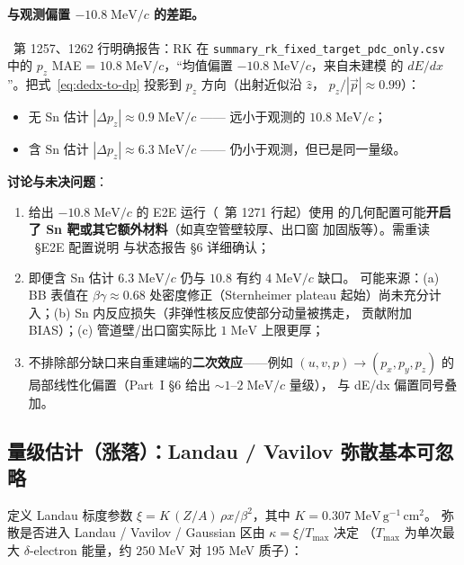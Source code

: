 \paragraph{与观测偏置 $-10.8\;\mathrm{MeV}/c$ 的差距。}
\StatusReport{}~第 1257、1262 行明确报告：RK 在 \texttt{summary\_rk\_fixed\_target\_pdc\_only.csv}
中的 $p_z$ MAE = $10.8\;\mathrm{MeV}/c$，``均值偏置 $-10.8\;\mathrm{MeV}/c$，来自未建模
的 $dE/dx$''。把式~\ref{eq:dedx-to-dp} 投影到 $p_z$ 方向（出射近似沿 $\hat z$，
$p_z/|\vec p| \approx 0.99$）：
\begin{itemize}
  \item 无 Sn 估计 $|\Delta p_z| \approx 0.9\;\mathrm{MeV}/c$ —— 远小于观测的 $10.8\;\mathrm{MeV}/c$；
  \item 含 Sn 估计 $|\Delta p_z| \approx 6.3\;\mathrm{MeV}/c$ —— 仍小于观测，但已是同一量级。
\end{itemize}

\textbf{讨论与未决问题}：
\begin{enumerate}
  \item 给出 $-10.8\;\mathrm{MeV}/c$ 的 E2E 运行（\StatusReport{}~第 1271 行起）使用
        的几何配置可能\textbf{开启了 Sn 靶或其它额外材料}（如真空管壁较厚、出口窗
        加固版等）。需重读 \StatusReport{}~§E2E 配置说明 与状态报告 \S 6 详细确认；
  \item 即便含 Sn 估计 $6.3\;\mathrm{MeV}/c$ 仍与 $10.8$ 有约 $4\;\mathrm{MeV}/c$ 缺口。
        可能来源：(a) BB 表值在 $\beta\gamma \approx 0.68$ 处密度修正（Sternheimer
        plateau 起始）尚未充分计入；(b) Sn 内反应损失（非弹性核反应使部分动量被携走，
        贡献附加 BIAS）；(c) 管道壁/出口窗实际比 $1\;\mathrm{MeV}$ 上限更厚；
  \item 不排除部分缺口来自重建端的\textbf{二次效应}——例如 $(u,v,p) \to (p_x,p_y,p_z)$
        的局部线性化偏置（Part~I §6 给出 $\sim 1\text{--}2\;\mathrm{MeV}/c$ 量级），
        与 dE/dx 偏置同号叠加。
\end{enumerate}

\subsection{量级估计（涨落）：Landau / Vavilov 弥散基本可忽略}
\label{sec:budget-dedx-magnitude-fluct}

定义 Landau 标度参数 $\xi = K\,(Z/A)\,\rho x / \beta^2$，其中 $K = 0.307\;\mathrm{MeV\,g^{-1}\,cm^2}$。
弥散是否进入 Landau / Vavilov / Gaussian 区由 $\kappa = \xi / T_\mathrm{max}$ 决定
（$T_\mathrm{max}$ 为单次最大 $\delta$-electron 能量，约 $250\;\mathrm{MeV}$ 对 195 MeV
质子）：

